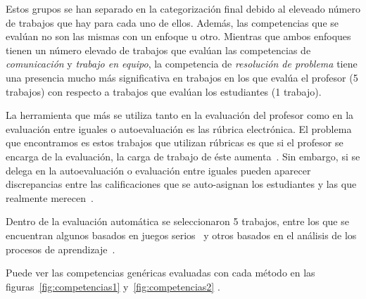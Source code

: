 Estos grupos se han separado en la categorización final debido al eleveado número de trabajos que hay para cada uno de ellos. Además, las competencias que se evalúan no son las mismas con un enfoque u otro. Mientras que ambos enfoques tienen un número elevado de trabajos que evalúan las competencias de \emph{comunicación} y \emph{trabajo en equipo}, la competencia de \emph{resolución de problema} tiene una presencia mucho más significativa en trabajos en los que evalúa el profesor (5 trabajos) con respecto a trabajos que evalúan los estudiantes (1 trabajo).

La herramienta que más se utiliza tanto en la evaluación del profesor como en la evaluación entre iguales o autoevaluación es las rúbrica electrónica. El problema que encontramos es estos trabajos que utilizan rúbricas es que si el profesor se encarga de la evaluación, la carga de trabajo de éste aumenta~\cite{lacuesta2009active}. Sin embargo, si se delega en la autoevaluación o evaluación entre iguales pueden aparecer discrepancias entre las calificaciones que se auto-asignan los estudiantes y las que realmente merecen~\cite{carreras2013promotion}. 

Dentro de la evaluación automática se seleccionaron 5 trabajos, entre los que se encuentran algunos basados en juegos serios~\cite{djaouti2011classifying,bedek2011behavioral} y otros basados en el análisis de los procesos de aprendizaje~\cite{rayon2014web,fidalgo:2015}.

Puede ver las competencias genéricas evaluadas con cada método en las figuras~\ref{fig:competencias1} y~\ref{fig:competencias2} .

